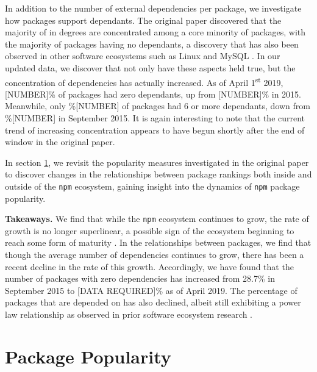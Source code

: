 \documentclass[10pt,conference]{IEEEtran}
\def\code#1{\texttt{#1}}
\begin{document}
In addition to the number of external dependencies per package, 
we investigate how packages support dependants. The original paper 
discovered that the majority of in degrees are concentrated among a core 
minority of packages, with the majority of packages having no dependants,
a discovery that has also been observed in other software ecosystems such
as Linux and MySQL \cite{Myers:2003}. In our updated data, we discover 
that not only have these aspects held true, but the concentration of 
dependencies has actually increased. As of April 1\textsuperscript{st} 2019, [NUMBER]\% of packages
had zero dependants, up from [NUMBER]\% in 2015. Meanwhile, only \%[NUMBER] of packages
had 6 or more dependants, down from \%[NUMBER] in September 2015. It is again interesting to note
that the current trend of increasing concentration appears to have begun shortly after the end of window in the original
paper.

In section \ref{popularity}, we revisit the popularity measures
investigated in the original paper \cite{Wittern:2016} to discover
changes in the relationships between package rankings
both inside and outside of the \code{npm} ecosystem,
gaining insight into the dynamics of \code{npm} package popularity.

\textbf{Takeaways.} We find that while the \code{npm} ecosystem
continues to grow, the rate of growth is no longer superlinear, 
a possible sign of the ecosystem beginning to reach some form of maturity \cite{Alves:2011}.
In the relationships between packages, we find that though the average number
of dependencies continues to grow, there has been a recent decline in the
rate of this growth. Accordingly, we have found that the number of packages with
zero dependencies has increased from 28.7\% in September 2015 to [DATA REQUIRED]\%
as of April 2019. The percentage of packages that are depended on has
also declined, albeit still exhibiting a power law relationship as observed
in prior software ecosystem research \cite{Wittern:2016, Myers:2003, Louridas:2008}.


\section{Package Popularity}\label{popularity}
\end{document}

